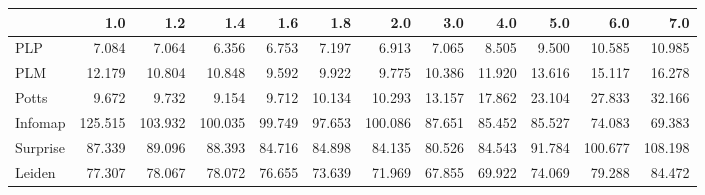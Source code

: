 \begin{tabular}{lrrrrrrrrrrr}
\toprule
{} &     1.0 &     1.2 &     1.4 &    1.6 &    1.8 &     2.0 &    3.0 &    4.0 &    5.0 &     6.0 &     7.0 \\
\midrule
PLP      &   7.084 &   7.064 &   6.356 &  6.753 &  7.197 &   6.913 &  7.065 &  8.505 &  9.500 &  10.585 &  10.985 \\
PLM      &  12.179 &  10.804 &  10.848 &  9.592 &  9.922 &   9.775 & 10.386 & 11.920 & 13.616 &  15.117 &  16.278 \\
Potts    &   9.672 &   9.732 &   9.154 &  9.712 & 10.134 &  10.293 & 13.157 & 17.862 & 23.104 &  27.833 &  32.166 \\
Infomap  & 125.515 & 103.932 & 100.035 & 99.749 & 97.653 & 100.086 & 87.651 & 85.452 & 85.527 &  74.083 &  69.383 \\
Surprise &  87.339 &  89.096 &  88.393 & 84.716 & 84.898 &  84.135 & 80.526 & 84.543 & 91.784 & 100.677 & 108.198 \\
Leiden   &  77.307 &  78.067 &  78.072 & 76.655 & 73.639 &  71.969 & 67.855 & 69.922 & 74.069 &  79.288 &  84.472 \\
\bottomrule
\end{tabular}
